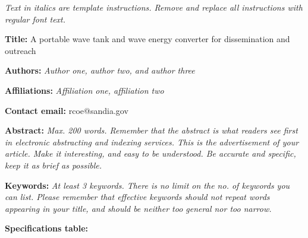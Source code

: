 \documentclass[11pt, letterpaper]{article}
\begin{document}
\begin{flushleft}

\textit{Text in italics are template instructions. Remove and replace all instructions with regular font text.}

\setlength{\parindent}{0pt}
\setlength{\parskip}{10pt}

\textbf{Title:} A portable wave tank and wave energy converter for dissemination and outreach

\textbf{Authors:} \textit{Author one, author two, and author three}

\textbf{Affiliations:} \textit{Affiliation one, affiliation two}

\textbf{Contact email:} rcoe@sandia.gov

\textbf{Abstract:} \textit{Max. 200 words. Remember that the abstract is what readers see first in electronic abstracting and indexing services. This is the advertisement of your article. Make it interesting, and easy to be understood. Be accurate and specific, keep it as brief as possible.}

\textbf{Keywords:} \textit{At least 3 keywords. There is no limit on the no. of keywords you can list. Please remember that effective keywords should not repeat words appearing in your title, and should be neither too general nor too narrow.}

\textbf{Specifications table:}


\end{flushleft}
\end{document}
